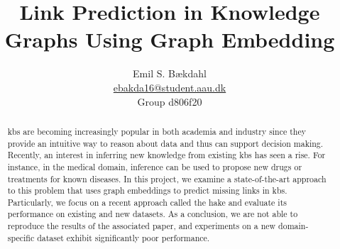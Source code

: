 \documentclass[compsoc, a4paper]{IEEEtran}
\title{Link Prediction in Knowledge Graphs Using Graph Embedding}
\author{Emil S. Bækdahl \\ \url{ebakda16@student.aau.dk} \\ Group d806f20}
\begin{document}
\maketitle
\begin{abstract}
  \Aclp{kb} are becoming increasingly popular in both academia and industry since they provide an intuitive way to reason about data and thus can support decision making.
  Recently, an interest in inferring new knowledge from existing \aclp{kb} has seen a rise.
  For instance, in the medical domain, inference can be used to propose new drugs or treatments for known diseases.
  In this project, we examine a state-of-the-art approach to this problem that uses graph embeddings to predict missing links in \aclp{kb}.
  Particularly, we focus on a recent approach called the \acl{hake} and evaluate its performance on existing and new datasets.
  As a conclusion, we are not able to reproduce the results of the associated paper, and experiments on a new domain-specific dataset exhibit significantly poor performance.
\end{abstract}

\acresetall%











\end{document}
